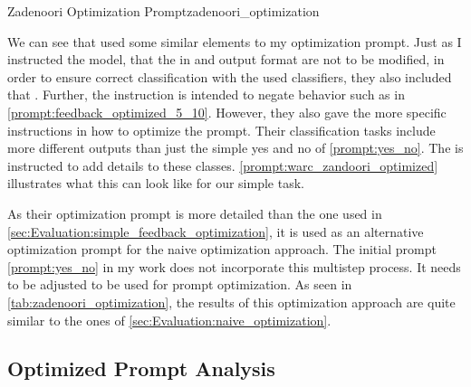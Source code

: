 
\begin{prompt}{Zadenoori Optimization Prompt}{zadenoori_optimization}
    \\
    
\end{prompt}

We can see that \citeauthor{zadenoori2025AutomaticPrompt} used some similar elements to my optimization prompt.
Just as I instructed the model, that the in and output format are not to be modified, in order to ensure correct classification with the used classifiers, they also included that .
Further, the instruction  is intended to negate behavior such as in \autoref{prompt:feedback_optimized_5_10}.
However, they also gave the \LLM more specific instructions in how to optimize the prompt.
Their classification tasks include more different outputs than just the simple yes and no of \autoref{prompt:yes_no}.
The \LLM is instructed to add details to these classes.
\autoref{prompt:warc_zandoori_optimized} illustrates what this can look like for our simple \TLR \RtR task.

As their optimization prompt is more detailed than the one used in \autoref{sec:Evaluation:simple_feedback_optimization}, it is used as an alternative optimization prompt for the naive optimization approach.
The initial prompt \autoref{prompt:yes_no} in my work does not incorporate this multistep process.
It needs to be adjusted to be used for \RtR prompt optimization.
As seen in \autoref{tab:zadenoori_optimization}, the results of this optimization approach are quite similar to the ones of \autoref{sec:Evaluation:naive_optimization}.

\subsection{Optimized Prompt Analysis}
\label{subsec:Evaluation:varying-the-optimization-prompt:optimized-prompt-analysis}

